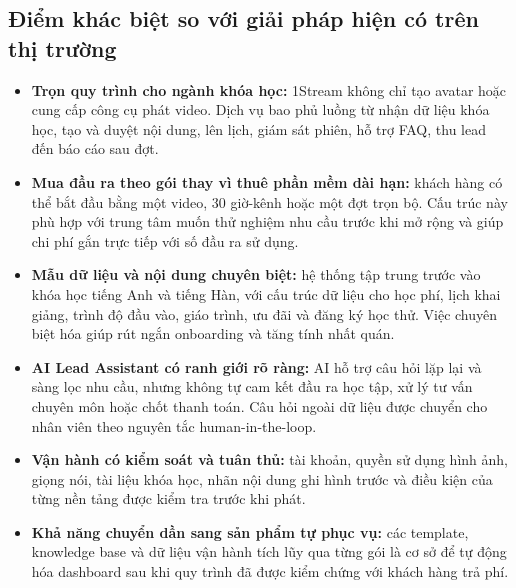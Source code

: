 \subsection{Điểm khác biệt so với giải pháp hiện có trên thị trường}

\begin{itemize}
    \item \textbf{Trọn quy trình cho ngành khóa học:} 1Stream không chỉ tạo
    avatar hoặc cung cấp công cụ phát video. Dịch vụ bao phủ luồng từ nhận dữ
    liệu khóa học, tạo và duyệt nội dung, lên lịch, giám sát phiên, hỗ trợ FAQ,
    thu lead đến báo cáo sau đợt.
    \item \textbf{Mua đầu ra theo gói thay vì thuê phần mềm dài hạn:} khách hàng
    có thể bắt đầu bằng một video, 30 giờ-kênh hoặc một đợt trọn bộ. Cấu trúc này
    phù hợp với trung tâm muốn thử nghiệm nhu cầu trước khi mở rộng và giúp chi
    phí gắn trực tiếp với số đầu ra sử dụng.
    \item \textbf{Mẫu dữ liệu và nội dung chuyên biệt:} hệ thống tập trung trước
    vào khóa học tiếng Anh và tiếng Hàn, với cấu trúc dữ liệu cho học phí, lịch
    khai giảng, trình độ đầu vào, giáo trình, ưu đãi và đăng ký học thử. Việc
    chuyên biệt hóa giúp rút ngắn onboarding và tăng tính nhất quán.
    \item \textbf{AI Lead Assistant có ranh giới rõ ràng:} AI hỗ trợ câu hỏi
    lặp lại và sàng lọc nhu cầu, nhưng không tự cam kết đầu ra học tập, xử lý tư
    vấn chuyên môn hoặc chốt thanh toán. Câu hỏi ngoài dữ liệu được chuyển cho
    nhân viên theo nguyên tắc human-in-the-loop.
    \item \textbf{Vận hành có kiểm soát và tuân thủ:} tài khoản, quyền sử dụng
    hình ảnh, giọng nói, tài liệu khóa học, nhãn nội dung ghi hình trước và điều
    kiện của từng nền tảng được kiểm tra trước khi phát.
    \item \textbf{Khả năng chuyển dần sang sản phẩm tự phục vụ:} các template,
    knowledge base và dữ liệu vận hành tích lũy qua từng gói là cơ sở để tự động
    hóa dashboard sau khi quy trình đã được kiểm chứng với khách hàng trả phí.
\end{itemize}
